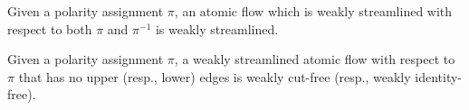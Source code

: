 
\begin{proposition}
Given a polarity assignment $\pi$, an atomic flow which is weakly streamlined with respect to both $\pi$ and $\pi^{-1}$ is weakly streamlined. 
\end{proposition}

\begin{proposition}
Given a polarity assignment $\pi$, a weakly streamlined atomic flow with respect to $\pi$ that has no upper (resp., lower) edges is weakly cut-free (resp., weakly identity-free).
\end{proposition}



